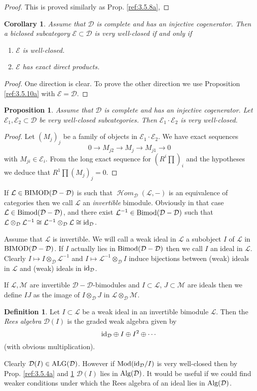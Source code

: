 \documentclass{amsproc}
\def\Dscr{{\mathcal D}}
\def\Escr{{\mathcal E}}
\def\Hscr{{\mathcal H}}
\def\Lscr{{\mathcal L}}
\def\Mscr{{\mathcal M}}
\def\HHom{\operatorname {\Hscr \mathit{om}}}
\def\Id{\text{id}}
\def\Mod{\mathop{\text{Mod}}}
\def\Bimod{\mathop{\text{Bimod}}}
\def\BIMOD{\mathop{\text{BIMOD}}}
\def\Alg{\mathop{\text{Alg}}}
\def\ALG{\mathop{\text{ALG}}}
\def\HHom{\operatorname {\Hscr \mathit{om}}}
\def\r{\rightarrow}
\let\oldtext\text
\def\text#1{\oldtext{\upshape #1}}
\newtheorem{propositions}[lemmas]{Proposition}
\newtheorem{corollarys}[lemmas]{Corollary}
\theoremstyle{definition}
\newtheorem{definitions}[lemmas]{Definition}
\theoremstyle{remark}
\numberwithin{equation}{section}
\numberwithin{table}{section}
\numberwithin{figure}{section}
\begin{document}
\begin{proof}
This is proved similarly as Prop. \ref{ref:3.5.8a},
\end{proof}
\begin{corollarys}
\label{ref:3.5.11a}
 Assume that $\Dscr$ is complete and has an injective
cogenerator. Then a biclosed subcategory $\Escr\subset \Dscr$ is very
well-closed if and only if
\begin{enumerate}
\item $\Escr$ is well-closed.
\item $\Escr$ has exact direct products.
\end{enumerate}
\end{corollarys}
\begin{proof} One direction is clear. To prove the other direction we use
  Proposition \ref{ref:3.5.10a} with $\Escr=\Dscr$.
\end{proof}
\begin{propositions}
\label{ref:3.5.12a}
Assume that $\Dscr$ is complete and has an injective cogenerator. Let
$\Escr_1,\Escr_2\subset \Dscr$ be very well-closed subcategories. Then
$\Escr_1\cdot \Escr_2$ is very well-closed.
\end{propositions}
\begin{proof}
Let $(M_j)_j$ be a family of objects in $\Escr_1\cdot\Escr_2$. We have exact
sequences
\[
0\r M_{j2}\r M_j \r M_{j1} \r 0
\]
with $M_{ji}\in \Escr_i$. From the long exact sequence for $(R^i\prod)_i$ and the
hypotheses we deduce that $R^1\prod (M_j)_j=0$.
\end{proof}
If $\Lscr\in\BIMOD(\Dscr-\Dscr)$ is such that $\HHom_\Dscr(\Lscr,-)$
is an equivalence of categories then we
call $\Lscr$ an \emph{invertible} bimodule. Obviously in that case $\Lscr\in
\Bimod(\Dscr-\Dscr)$, and there exist $\Lscr^{-1}\in \Bimod(\Dscr-\Dscr)$ such
that $\Lscr\otimes_\Dscr\Lscr^{-1}\cong \Lscr^{-1} \otimes_\Dscr \Lscr\cong
\Id_\Dscr$.

Assume that $\Lscr$ is invertible. We will call a weak ideal
 in $\Lscr$ a subobject $I$ of $\Lscr$ in $\BIMOD(\Dscr-\Dscr)$. If $I$
 actually lies in $\Bimod(\Dscr-\Dscr)$ then we call $I$ an ideal in $\Lscr$.
 Clearly $I\mapsto I\otimes_\Dscr\Lscr^{-1}$ and $I\mapsto \Lscr^{-1}
 \otimes_\Dscr I$ induce bijections between (weak) ideals in $\Lscr$ and (weak)
 ideals in $\Id_\Dscr$.

If $\Lscr,\Mscr$ are invertible $\Dscr-\Dscr$-bimodules and $I\subset \Lscr$,
$J\subset \Mscr$ are ideals then we define $IJ$ as the image of $I\otimes_\Dscr
J$ in $\Lscr\otimes_\Dscr\Mscr$.
\begin{definitions}
\label{ref:3.5.13a}
Let $I\subset \Lscr$ be a weak ideal in an invertible bimodule $\Lscr$. Then
the \emph{Rees algebra} $\Dscr(I)$ is the graded weak algebra given by
\[
\Id_\Dscr\oplus I\oplus I^2\oplus\cdots
\]
(with obvious multiplication).
\end{definitions}
Clearly $\Dscr(I)\in \ALG(\Dscr)$. However if $\Mod(\Id_\Dscr/I)$ is
very well-closed then by Prop. \ref{ref:3.5.4a} and \ref{ref:3.5.12a}
$\Dscr(I)$ lies in $\Alg(\Dscr)$. It would be useful if we could find
weaker conditions under which the Rees algebra of an ideal lies in
$\Alg(\Dscr)$.
\end{document}
